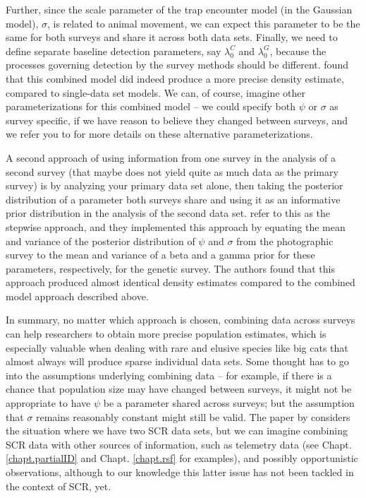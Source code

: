 \begin{table}[ht]
Further, since the scale parameter of the trap encounter model (in
\citet{gopalaswamy_etal:2012mee} the Gaussian model), $\sigma$, is
related to animal movement, we can expect this parameter to be the
same for both surveys and share it across both data sets. Finally, we
need to define separate baseline detection parameters, say
$\lambda_{0}^{C}$ and $\lambda_{0}^{G}$, because the processes
governing detection by the survey methods should be
different. \citet{gopalaswamy_etal:2012mee} found that this combined
model did indeed produce a more precise density estimate, compared to
single-data set models.  We can, of course, imagine other
parameterizations for this combined model -- we could specify both
$\psi$ or $\sigma$ as survey specific, if we have reason to believe
they changed between surveys, and we refer you to
\citet{gopalaswamy_etal:2012mee} for more details on these alternative
parameterizations.

A second approach of using information from one survey in the analysis
of a second survey (that maybe does not yield quite as much data as
the primary survey) is by analyzing your primary data set alone, then
taking the posterior distribution of a parameter both surveys share
and using it as an informative prior distribution in the analysis of
the second data set. \citet{gopalaswamy_etal:2012mee} refer to this as
the stepwise approach, and they implemented this approach by equating
the mean and variance of the posterior distribution of $\psi$ and
$\sigma$ from the photographic survey to the mean and variance of a
beta and a gamma prior for these parameters, respectively, for the
genetic survey. The authors found that this approach produced almost
identical density estimates compared to the combined model approach
described above.

In summary, no matter which approach is chosen, combining data across
surveys can help researchers to obtain more precise population
estimates, which is especially valuable when dealing with rare and
elusive species like big cats that almost always will produce sparse
individual data sets. Some thought has to go into the assumptions
underlying combining data -- for example, if there is a chance that
population size may have changed between surveys, it might not be
appropriate to have $\psi$ be a parameter shared across surveys; but
the assumption that $\sigma$ remains reasonably constant might still
be valid. The paper by \citet{gopalaswamy_etal:2012mee} considers the
situation where we have two SCR data sets, but we can imagine
combining SCR data with other sources of information, such as
telemetry data (see Chapt. \ref{chapt.partialID} and
Chapt. \ref{chapt.rsf} for examples), and possibly opportunistic
observations, although to our knowledge this latter issue has not been
tackled in the context of SCR, yet.



\end{table}

